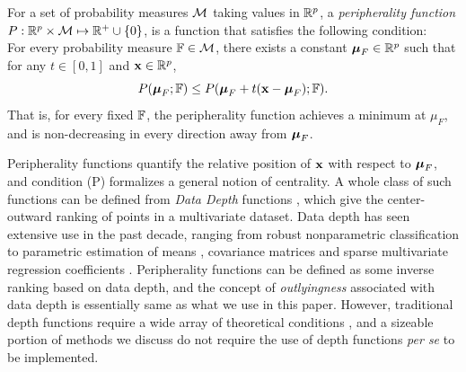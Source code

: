 \begin{Definition}\label{defn:peripherality}
For a set of probability measures $\mathcal{M}$ taking values in ${\mathbb{R}}^p$, a {\it peripherality function} $ P : {\mathbb{R}}^p \times \mathcal{M} \mapsto {\mathbb{R}}^+ \cup \{ 0\}$,  is a function that satisfies the following condition:\\

 For every probability measure ${\mathbb{F}} \in \mathcal{M}$, there exists a constant ${\boldsymbol{\mu}}_{F} \in {\mathbb{R}}^p$ such that for any $t \in [ 0, 1]$ and ${\bf{x}} \in {\mathbb{R}}^p$,
%
$$ 
P ( {\boldsymbol{\mu}}_{F} ; {\mathbb{F}} ) \leq P ( {\boldsymbol{\mu}}_{F} + t ( {\bf{x}} - {\boldsymbol{\mu}}_{F} ); {\mathbb{F}} ). 
$$ 
%
That is, for every fixed ${\mathbb{F}}$, the peripherality function achieves a minimum at $\mu_{F}$, and is non-decreasing in every direction away from ${\boldsymbol{\mu}}_{F}$.
\end{Definition}

Peripherality functions quantify the relative position of ${\bf{x}}$ with respect to ${\boldsymbol{\mu}}_{F}$, and condition (P) formalizes a general notion of centrality. A whole class of such functions can be defined from {\it Data Depth} functions \citep{zuo00}, which give the center-outward ranking of points in a multivariate dataset. Data depth has seen extensive use in the past decade, ranging from robust nonparametric classification \citep{jornsten04, ghosh05, dutta12, sguera14} to parametric estimation of means \citep{ZuoCuiHe04}, covariance matrices \citep{ZuoCui05} and sparse multivariate regression coefficients \citep{DuttaGenton17,MajumdarChatterjeeStat}. Peripherality functions can be defined as some inverse ranking based on data depth, and the concept of {\it outlyingness} associated with data depth is essentially same as what we use in this paper. However, traditional depth functions require a wide array of theoretical conditions \citep{zuo00}, and a sizeable portion of methods we discuss do not require the use of depth functions {\it per se} to be implemented. %


